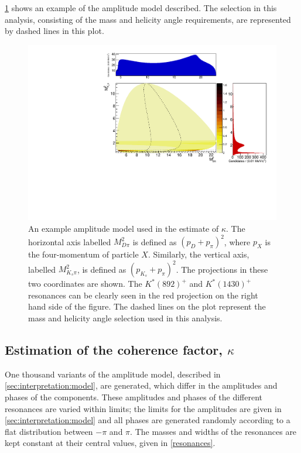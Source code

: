 \Fig\ref{dalitzplot} shows an example of the amplitude model described. The \Kstar selection in this analysis, consisting of the \Kstar mass and \KS helicity angle requirements, are represented by dashed lines in this plot.

\begin{figure}[h]
\centering
\includegraphics[width=\linewidth]{figures/results/dalitz.pdf}
\caption{An example amplitude model used in the estimate of $\kappa$. The horizontal axis labelled $M_{D\pi}^2$ is defined as $(p_D + p_{\pi})^2$, where $p_{X}$ is the four-momentum of particle $X$. Similarly, the vertical axis, labelled $M_{K_s\pi}^2$, is defined as $(p_{K_s} + p_{\pi})^2$. The projections in these two coordinates are shown. The $K^*(892)^+$ and $K^*(1430)^+$ resonances can be clearly seen in the red projection on the right hand side of the figure. The dashed lines on the plot represent the \Kstar mass and \KS helicity angle selection used in this analysis.}
\label{dalitzplot}
\end{figure}

\subsection{Estimation of the coherence factor, $\kappa$}
\label{sec:interpretation:kappa}

One thousand variants of the amplitude model, described in \sect\ref{sec:interpretation:model}, are generated, which differ in the amplitudes and phases of the components. These amplitudes and phases of the different resonances are varied within limits; the limits for the amplitudes are given in \sect\ref{sec:interpretation:model} and all phases are generated randomly according to a flat distribution between $-\pi$ and $\pi$. The masses and widths of the resonances are kept constant at their central values, given in \tab\ref{resonances}. 

